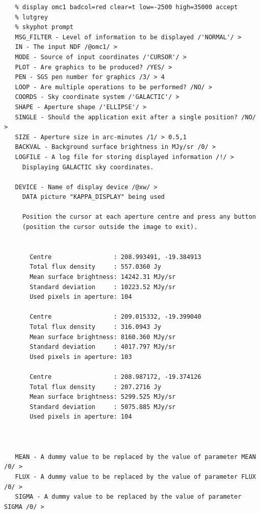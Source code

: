 \documentclass[11pt]{article}
\begin{document}
\begin{verbatim}
   % display omc1 badcol=red clear=t low=-2500 high=35000 accept
   % lutgrey
   % skyphot prompt
   MSG_FILTER - Level of information to be displayed /'NORMAL'/ >
   IN - The input NDF /@omc1/ >
   MODE - Source of input coordinates /'CURSOR'/ >
   PLOT - Are graphics to be produced? /YES/ >
   PEN - SGS pen number for graphics /3/ > 4
   LOOP - Are multiple operations to be performed? /NO/ >
   COORDS - Sky coordinate system /'GALACTIC'/ >
   SHAPE - Aperture shape /'ELLIPSE'/ >
   SINGLE - Should the application exit after a single position? /NO/ >
   SIZE - Aperture size in arc-minutes /1/ > 0.5,1
   BACKVAL - Background surface brightness in MJy/sr /0/ >
   LOGFILE - A log file for storing displayed information /!/ >
     Displaying GALACTIC sky coordinates.

   DEVICE - Name of display device /@xw/ >
     DATA picture "KAPPA_DISPLAY" being used

     Position the cursor at each aperture centre and press any button
     (position the cursor outside the image to exit).


       Centre                 : 208.993491, -19.384913
       Total flux density     : 557.0360 Jy
       Mean surface brightness: 14242.31 MJy/sr
       Standard deviation     : 10223.52 MJy/sr
       Used pixels in aperture: 104

       Centre                 : 209.015332, -19.399040
       Total flux density     : 316.0943 Jy
       Mean surface brightness: 8160.360 MJy/sr
       Standard deviation     : 4017.797 MJy/sr
       Used pixels in aperture: 103

       Centre                 : 208.987172, -19.374126
       Total flux density     : 207.2716 Jy
       Mean surface brightness: 5299.525 MJy/sr
       Standard deviation     : 5075.885 MJy/sr
       Used pixels in aperture: 104



   MEAN - A dummy value to be replaced by the value of parameter MEAN /0/ >
   FLUX - A dummy value to be replaced by the value of parameter FLUX /0/ >
   SIGMA - A dummy value to be replaced by the value of parameter SIGMA /0/ >
\end{verbatim}
\end{document}

